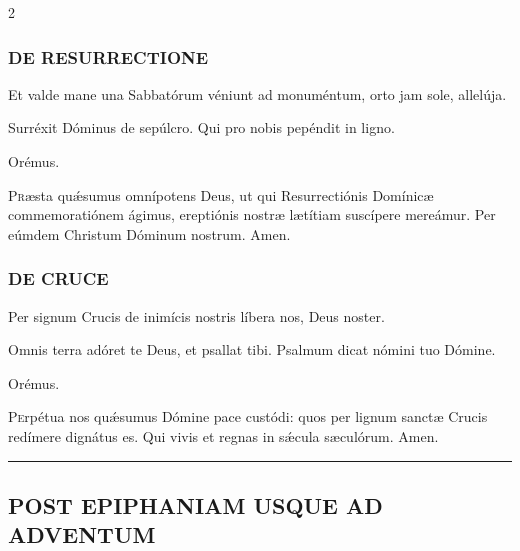 \documentclass[9pt,twoside]{extarticle}
\begin{document}
\begin{multicols}{2}
\subsubsection*{\center \textsc{DE RESURRECTIONE}}
\begin{tightlist}{}
\item {}
\item {} Et valde mane una Sabbatórum véniunt ad monuméntum, orto jam sole, allelúja.
\item {} Surréxit Dóminus de sepúlcro.  Qui pro nobis pepéndit in ligno.
\item Orémus. \hfill {}
\end{tightlist}
\lettrine{P}ræsta quǽsumus omnípotens Deus, ut qui Resurrectiónis Domínicæ commemoratiónem ágimus, ereptiónis nostræ lætítiam suscípere mereámur. Per eúmdem Christum Dóminum nostrum. Amen.

\subsubsection*{\center \textsc{DE CRUCE}}
\begin{tightlist}{}
\item {}
\item {} Per signum Crucis de inimícis nostris líbera nos, Deus noster.
\item {} Omnis terra adóret te Deus, et psallat tibi.  Psalmum dicat nómini tuo Dómine.
\item Orémus. \hfill {}
\end{tightlist}
\lettrine{P}erpétua nos quǽsumus Dómine pace custódi: quos per lignum sanctæ Crucis redímere dignátus es. Qui vivis et regnas in sǽcula sæculórum. Amen.

\begin{center}\textcolor{red}{\rule{\linewidth}{0.5pt}} \end{center}

\subsection*{\center \textsc{POST EPIPHANIAM USQUE AD ADVENTUM}}
\begin{tightlist}{}
\item {}
\end{tightlist}


\end{multicols}
\end{document}
